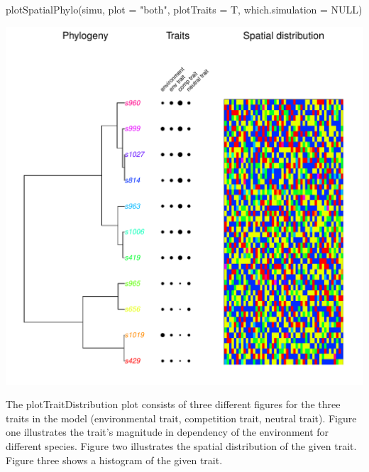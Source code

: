 \documentclass [a4paper]{tufte-book}\usepackage[]{graphicx}\usepackage[]{color}
\makeatletter
\def\maxwidth{ %
  \ifdim\Gin@nat@width>\linewidth
    \linewidth
  \else
    \Gin@nat@width
  \fi
}
\makeatother
\begin{document}
\begin{Schunk}
\begin{Sinput}
plotSpatialPhylo(simu, plot = "both", plotTraits = T, which.simulation = NULL)
\end{Sinput}

\includegraphics[width=\maxwidth]{figure/unnamed-chunk-10-1} \end{Schunk}


The plotTraitDistribution plot consists of three different figures for the three traits in the model (environmental trait, competition trait, neutral trait). Figure one illustrates the trait's magnitude in dependency of the environment for different species. Figure two illustrates the spatial distribution of the given trait. Figure three shows a histogram of the given trait.
\end{document}
